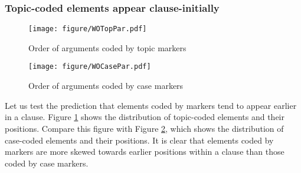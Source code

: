 \subsubsection{Topic-coded elements appear clause-initially}\label{WO:ClauseInit:Ident:Topic}

\begin{figure}
	\begin{center}
	\texttt{[image: figure/WOTopPar.pdf]}
	\caption{Order of arguments coded by topic markers}
	\label{WOTopParF}
	\end{center}
\end{figure}
\begin{figure}
	\begin{center}
	\texttt{[image: figure/WOCasePar.pdf]}
	\caption{Order of arguments coded by case markers}
	\label{WOCaseParF}
	\end{center}
\end{figure}

Let us test the prediction that elements coded by  markers tend to appear earlier in a clause.
Figure \ref{WOTopParF} shows the distribution of topic-coded elements
and their positions.
Compare this figure with Figure \ref{WOCaseParF},
which shows the distribution of case-coded elements and their positions.
It is clear that elements coded by  markers are more skewed towards earlier positions within a clause than those coded by case markers.

